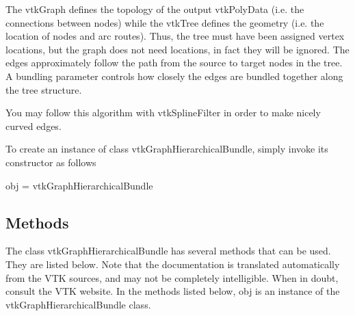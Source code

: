 The vtk\-Graph defines the topology of the output vtk\-Poly\-Data (i.\-e. the connections between nodes) while the vtk\-Tree defines the geometry (i.\-e. the location of nodes and arc routes). Thus, the tree must have been assigned vertex locations, but the graph does not need locations, in fact they will be ignored. The edges approximately follow the path from the source to target nodes in the tree. A bundling parameter controls how closely the edges are bundled together along the tree structure.

You may follow this algorithm with vtk\-Spline\-Filter in order to make nicely curved edges.

To create an instance of class vtk\-Graph\-Hierarchical\-Bundle, simply invoke its constructor as follows \begin{DoxyVerb}  obj = vtkGraphHierarchicalBundle
\end{DoxyVerb}
 \hypertarget{vtkwidgets_vtkxyplotwidget_Methods}{}\subsection{Methods}\label{vtkwidgets_vtkxyplotwidget_Methods}
The class vtk\-Graph\-Hierarchical\-Bundle has several methods that can be used. They are listed below. Note that the documentation is translated automatically from the V\-T\-K sources, and may not be completely intelligible. When in doubt, consult the V\-T\-K website. In the methods listed below, {\ttfamily obj} is an instance of the vtk\-Graph\-Hierarchical\-Bundle class. 
